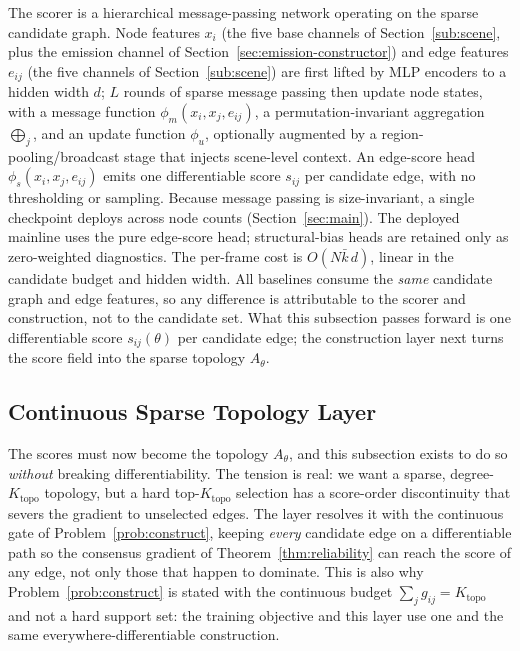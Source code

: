 \documentclass[journal]{IEEEtran}
\newcommand{\kcand}{\ensuremath{\bar k}}                 %
\newcommand{\Ktopo}{\ensuremath{K_{\mathrm{topo}}}}      %
\begin{document}
The scorer is a hierarchical message-passing network operating on the sparse
candidate graph. Node features $x_i$ (the five base channels of
Section~\ref{sub:scene}, plus the emission channel of
Section~\ref{sec:emission-constructor}) and edge features $e_{ij}$ (the five
channels of Section~\ref{sub:scene}) are first lifted by MLP encoders to a hidden
width $d$; $L$ rounds of sparse message passing then update node states, with a
message function $\phi_m(x_i,x_j,e_{ij})$, a permutation-invariant aggregation
$\bigoplus_{j}$, and an update function $\phi_u$, optionally augmented by a
region-pooling/broadcast stage that injects scene-level context. An edge-score
head $\phi_s(x_i,x_j,e_{ij})$ emits one differentiable score $s_{ij}$ per
candidate edge, with no thresholding or sampling. Because message passing is
size-invariant, a single checkpoint deploys across node counts
(Section~\ref{sec:main}). The deployed mainline uses the pure edge-score head;
structural-bias heads are retained only as zero-weighted diagnostics. The
per-frame cost is $O(N\kcand\,d)$, linear in the candidate budget and hidden
width. All baselines consume the \emph{same} candidate graph and edge features,
so any difference is attributable to the scorer and construction, not to the
candidate set. What this subsection passes forward is one differentiable score
$s_{ij}(\theta)$ per candidate edge; the construction layer next turns the score
field into the sparse topology $A_\theta$.

\subsection{Continuous Sparse Topology Layer}\label{sub:construct}

The scores must now become the topology $A_\theta$, and this subsection exists to
do so \emph{without} breaking differentiability. The tension is real: we want a
sparse, degree-$\Ktopo$ topology, but a hard top-$\Ktopo$ selection has a
score-order discontinuity that severs the gradient to unselected edges. The layer
resolves it with the continuous gate of Problem~\ref{prob:construct}, keeping
\emph{every} candidate edge on a differentiable path so the consensus gradient of
Theorem~\ref{thm:reliability} can reach the score of any edge, not only those that
happen to dominate. This is also why Problem~\ref{prob:construct} is stated with
the continuous budget $\sum_j g_{ij}=\Ktopo$ and not a hard support set: the
training objective and this layer use one and the same everywhere-differentiable
construction.
\end{document}
